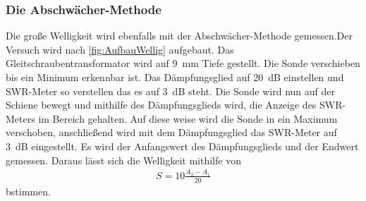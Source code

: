 \subsubsection{Die Abschwächer-Methode}
Die große Welligkeit wird ebenfalls mit der Abschwächer-Methode gemessen.Der Versuch wird nach \cref{fig:AufbauWellig} aufgebaut. Das Gleitschraubentransformator wird auf \SI{9}{\milli\meter} Tiefe gestellt.
Die Sonde verschieben bis ein Minimum erkennbar ist. Das Dämpfungsglied auf \SI{20}{\deci\bel} einstellen und SWR-Meter so verstellen das es auf \SI{3}{\deci\bel} steht. Die Sonde wird nun auf der Schiene bewegt und mithilfe des Dämpfungsglieds wird, die Anzeige des SWR-Meters im Bereich gehalten. Auf diese weise wird die Sonde in ein Maximum verschoben, anschließend wird mit dem Dämpfungsglied das SWR-Meter auf \SI{3}{\deci\bel} eingestellt. Es wird der Anfangswert des Dämpfungsglieds und der Endwert gemessen. Daraus lässt sich die Welligkeit mithilfe von 
\begin{align}
	S=10\frac{A_2-A_1}{20}
\end{align}
bstimmen.
